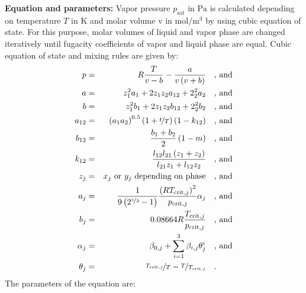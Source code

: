 \textbf{Equation and parameters:}
\newline
%
Vapor pressure $p_\mathrm{sat}$ in $\si{\pascal}$ is calculated depending on temperature $T$ in $\si{\kelvin}$ and molar volume v in $\si{\mole\per\cubic\meter}$ by using cubic equation of state. For this purpose, molar volumes of liquid and vapor phase are changed iteratively until fugacity coefficients of vapor and liquid phase are equal. Cubic equation of state and mixing rules are given by:
\begin{equation*}
\begin{split}
p &=& R \frac{T}{v - b} - \frac{a}{v \left(v + b\right)} & \quad\text{, and} \\
a &=& z_1^2 a_1 + 2 z_1 z_2 a_{12} + 2_2^2 a_2 & \quad\text{, and} \\
b &=& z_1^2 b_1 + 2 z_1 z_2 b_{12} + 2_2^2 b_2 & \quad\text{, and} \\
a_{12} &=& \left( a_1 a_2 \right) ^{0.5} \left( 1 + \nicefrac{t}{T} \right) \left(1 - k_{12} \right) & \quad\text{, and} \\
b_{12} &=& \frac{ b_1 + b_2 }{2} \left(1 - m \right) & \quad\text{, and} \\
k_{12} &=& \frac{l_{12} l_{21} \left(z_1 + z_2 \right)}{l_{21} z_1 + l_{12} z_2} & \quad\text{, and} \\
z_j &=& x_j \textrm { or } y_j \textrm{ depending on phase} & \quad\text{, and} \\
a_j &=& \frac{1}{9 \left(2^{\nicefrac{1}{3}} - 1\right)} \frac{\left(R T_{\mathrm{crit},j} \right)^2}{p_{\mathrm{crit},j}} \alpha_j & \quad\text{, and} \\
b_j &=& 0.08664 R \frac{T_{\mathrm{crit},j}}{p_{\mathrm{crit},j}} & \quad\text{, and} \\
\alpha_j &=& \beta_{0,j} + \sum_{i=1}^{3} \beta_{i,j} \theta_j^i & \quad\text{, and} \\
\theta_j &=& \nicefrac{T_{\mathrm{crit},j}}{T} - \nicefrac{T}{T_{\mathrm{crit},j}} & \quad\text{.}
\end{split}
\end{equation*}%
The parameters of the equation are:
%
